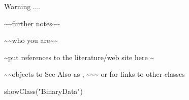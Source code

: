 \begin{Section}{Warning}
....
\end{Section}
\begin{Note}\relax
\textasciitilde{}\textasciitilde{}further notes\textasciitilde{}\textasciitilde{}
\end{Note}
\begin{Author}\relax
\textasciitilde{}\textasciitilde{}who you are\textasciitilde{}\textasciitilde{}
\end{Author}
\begin{References}\relax
\textasciitilde{}put references to the literature/web site here \textasciitilde{}
\end{References}
\begin{SeeAlso}\relax
\textasciitilde{}\textasciitilde{}objects to See Also as , \textasciitilde{}\textasciitilde{}\textasciitilde{}
or  for links to other classes
\end{SeeAlso}
\begin{Examples}
\begin{ExampleCode}
showClass("BinaryData")
\end{ExampleCode}
\end{Examples}

